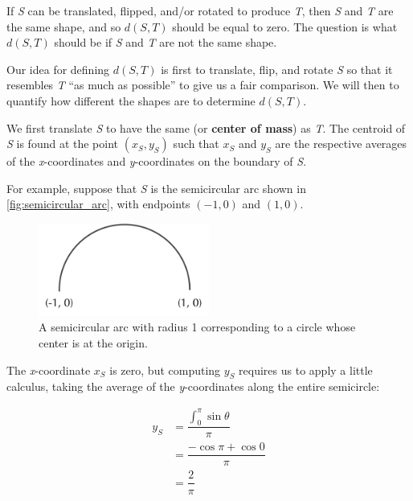 If \textit{S} can be translated, flipped, and/or rotated to produce \textit{T}, then \textit{S} and \textit{T} are the same shape, and so $d(S, T)$ should be equal to zero. The question is what $d(S, T)$ should be if \textit{S} and \textit{T} are not the same shape.

Our idea for defining $d(S, T)$ is first to translate, flip, and rotate \textit{S} so that it resembles \textit{T} ``as much as possible'' to give us a fair comparison. We will then to quantify how different the shapes are to determine $d(S, T)$.

We first translate \textit{S} to have the same  (or \textbf{center of mass}) as \textit{T}. The centroid of \textit{S} is found at the point $(x_{S}, y_{S})$ such that $x_{S}$ and $y_{S}$ are the respective averages of the \textit{x}-coordinates and \textit{y}-coordinates on the boundary of \textit{S}.

For example, suppose that \textit{S} is the semicircular arc shown in \autoref{fig:semicircular_arc}, with endpoints $(-1, 0)$ and $(1, 0)$.

\begin{figure}[h]
	\centering
	\mySfFamily
	\includegraphics[width = 0.5\textwidth]{../images/semicircular_arc.png}
	\caption{A semicircular arc with radius 1 corresponding to a circle whose center is at the origin.}
	\label{fig:semicircular_arc}
\end{figure}

The \textit{x}-coordinate $x_{S}$ is zero, but computing $y_{S}$ requires us to apply a little calculus, taking the average of the \textit{y}-coordinates along the entire semicircle:

\begin{align*}
	y_S &= \dfrac{\int_{0}^{\pi}{\sin{\theta}}}{\pi} \\
	&= \dfrac{-\cos{\pi} + \cos{0}}{\pi} \\
	&= \dfrac{2}{\pi}
\end{align*}



\begin{qbox}\end{qbox}

